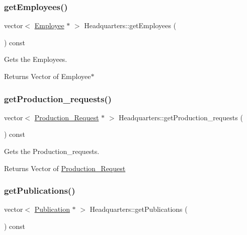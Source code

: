 \subsubsection{\texorpdfstring{get\+Employees()}{getEmployees()}}
{\footnotesize\ttfamily vector$<$ \hyperlink{class_employee}{Employee} $\ast$ $>$ Headquarters\+::get\+Employees (\begin{DoxyParamCaption}{ }\end{DoxyParamCaption}) const}



Gets the Employees. 

\begin{DoxyReturn}{Returns}
Vector of Employee$\ast$ 
\end{DoxyReturn}
\mbox{\label{class_headquarters_a54e99ea57123ca6a53e640a2c95726cc}} 
\subsubsection{\texorpdfstring{get\+Production\+\_\+requests()}{getProduction\_requests()}}
{\footnotesize\ttfamily vector$<$ \hyperlink{class_production___request}{Production\+\_\+\+Request} $\ast$ $>$ Headquarters\+::get\+Production\+\_\+requests (\begin{DoxyParamCaption}{ }\end{DoxyParamCaption}) const}



Gets the Production\+\_\+requests. 

\begin{DoxyReturn}{Returns}
Vector of \hyperlink{class_production___request}{Production\+\_\+\+Request} 
\end{DoxyReturn}
\mbox{\label{class_headquarters_a71a68cac0db5c9aa33b548f4b696b9bc}} 
\subsubsection{\texorpdfstring{get\+Publications()}{getPublications()}}
{\footnotesize\ttfamily vector$<$ \hyperlink{class_publication}{Publication} $\ast$ $>$ Headquarters\+::get\+Publications (\begin{DoxyParamCaption}{ }\end{DoxyParamCaption}) const}



